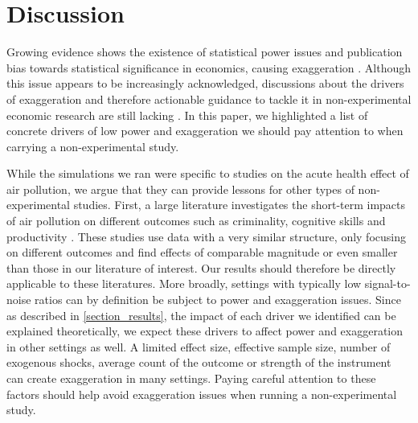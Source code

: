 \documentclass[12pt]{article}
\begin{document}

\section{Discussion}\label{section_discussion}

        \begin{sloppypar}
        Growing evidence shows the existence of statistical power issues and publication bias towards statistical significance in economics, causing exaggeration \citep{brodeur_star_2016, ioannidis_power_2017, brodeur_methods_2020, ferraro_featureis_2020}. Although this issue appears to be increasingly acknowledged, discussions about the drivers of exaggeration and therefore actionable guidance to tackle it in non-experimental economic research are still lacking \citep{altoe_enhancing_2020, black_simulated_2022}. In this paper, we highlighted a list of concrete drivers of low power and exaggeration we should pay attention to when carrying a non-experimental study. %
        \end{sloppypar}

        While the simulations we ran were specific to studies on the acute health effect of air pollution, we argue that they can provide lessons for other types of non-experimental studies. First, a large literature investigates the short-term impacts of air pollution on different outcomes such as criminality, cognitive skills and productivity \citep[for instance]{herrnstadt_air_2021, ebenstein_long-run_2016, adhvaryu2022management}. These studies use data with a very similar structure, only focusing on different outcomes and find effects of comparable magnitude or even smaller than those in our literature of interest. Our results should therefore be directly applicable to these literatures. More broadly, settings with typically low signal-to-noise ratios can by definition be subject to power and exaggeration issues. Since as described in \cref{section_results}, the impact of each driver we identified can be explained theoretically, we expect these drivers to affect power and exaggeration in other settings as well. A limited effect size, effective sample size, number of exogenous shocks, average count of the outcome or strength of the instrument can create exaggeration in many settings. Paying careful attention to these factors should help avoid exaggeration issues when running a non-experimental study.
        
\end{document}
